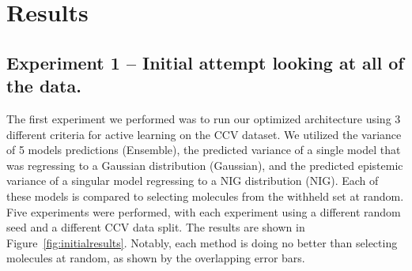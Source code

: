 \documentclass[journal=jmcmar,manuscript=article]{achemso}
\begin{document}
\section{Results}

\subsection{Experiment 1 -- Initial attempt looking at all of the data.}
The first experiment we performed was to run our optimized architecture using 3 different criteria for active learning on the CCV dataset. We utilized the variance of 5 models predictions (Ensemble), the predicted variance of a single model that was regressing to a Gaussian distribution (Gaussian), and the predicted epistemic variance of a singular model regressing to a NIG distribution (NIG). Each of these models is compared to selecting molecules from the withheld set at random. Five experiments were performed, with each experiment using a different random seed and a different CCV data split. The results are shown in Figure~\ref{fig:initialresults}. Notably, each method is doing no better than selecting molecules at random, as shown by the overlapping error bars.
\end{document}
